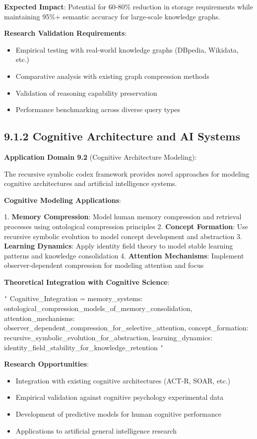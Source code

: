 \textbf{Expected Impact}: Potential for 60-80\% reduction in storage requirements while maintaining 95\%+ semantic accuracy for large-scale knowledge graphs.

\textbf{Research Validation Requirements}:
\begin{itemize}
\item Empirical testing with real-world knowledge graphs (DBpedia, Wikidata, etc.)
\item Comparative analysis with existing graph compression methods
\item Validation of reasoning capability preservation
\item Performance benchmarking across diverse query types
\end{itemize}

\subsection{9.1.2 Cognitive Architecture and AI Systems}

\textbf{Application Domain 9.2} (Cognitive Architecture Modeling):

The recursive symbolic codex framework provides novel approaches for modeling cognitive architectures and artificial intelligence systems.

\textbf{Cognitive Modeling Applications}:

1. \textbf{Memory Compression}: Model human memory compression and retrieval processes using ontological compression principles
2. \textbf{Concept Formation}: Use recursive symbolic evolution to model concept development and abstraction
3. \textbf{Learning Dynamics}: Apply identity field theory to model stable learning patterns and knowledge consolidation
4. \textbf{Attention Mechanisms}: Implement observer-dependent compression for modeling attention and focus

\textbf{Theoretical Integration with Cognitive Science}:

\texttt{`}
Cognitive_Integration = {
    memory_systems: ontological_compression_models_of_memory_consolidation,
    attention_mechanisms: observer_dependent_compression_for_selective_attention,
    concept_formation: recursive_symbolic_evolution_for_abstraction,
    learning_dynamics: identity_field_stability_for_knowledge_retention
}
\texttt{`}

\textbf{Research Opportunities}:
\begin{itemize}
\item Integration with existing cognitive architectures (ACT-R, SOAR, etc.)
\item Empirical validation against cognitive psychology experimental data
\item Development of predictive models for human cognitive performance
\item Applications to artificial general intelligence research
\end{itemize}

